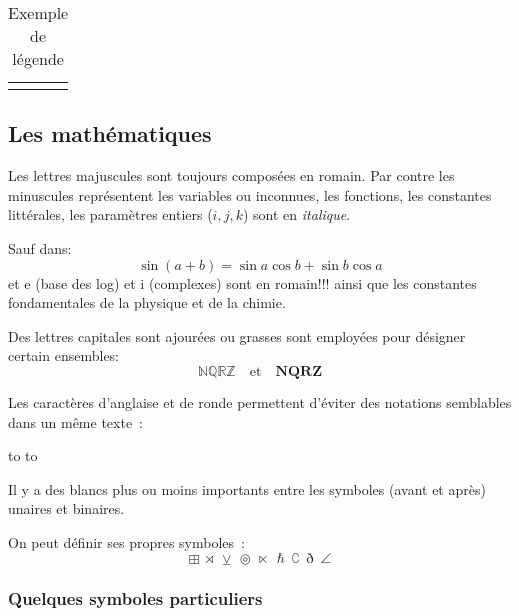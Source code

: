 \documentclass[twoside]{article}
\begin{document}
\begin{table}[htbp]\begin{center}
\begin{tabular}{|c|c|}
\hline %
       &       \\
\hline %
       &       \\
\hline %
\end{tabular}
\caption{Exemple de l\'egende}\label{tab:exp}
\end{center}\end{table}

\subsection{Les mathématiques}

Les lettres majuscules sont toujours compos\'ees en romain. Par contre
les minuscules repr\'esentent les variables ou inconnues, les
fonctions, les constantes litt\'erales, les param\`etres entiers
($i,j,k$) sont en {\it italique}.

Sauf dans: $$\sin(a+b)=\sin a\cos b + \sin b \cos a$$ et e (base des
log) et i (complexes) sont en romain!!! ainsi que les constantes
fondamentales de la physique et de la chimie.

Des lettres capitales sont ajour\'ees ou grasses sont employ\'ees pour
d\'esigner certain ensembles:
$$\mathbb{NQRZ}\quad\text{et}\quad\boldsymbol{NQRZ}$$

Les caract\`eres d'anglaise et de ronde permettent d'\'eviter des
notations semblables dans un m\^eme texte~:

\hbox to  \hbox to 

Il y a des blancs plus ou moins importants entre les symboles (avant
et apr\`es) unaires et binaires.

On peut d\'efinir ses propres symboles~:
$$\boxplus\ \rtimes\ \veebar\ \circledcirc\ \ltimes\ \hslash\ \complement
\ \eth\ \angle$$


\subsubsection{Quelques symboles particuliers}
\end{document}
